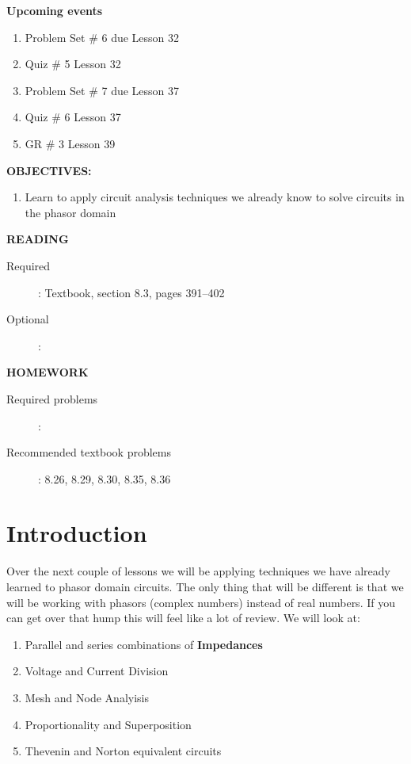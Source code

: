 \documentclass{handout}
\begin{document}
\maketitle

\textbf{Upcoming events}
\begin{enumerate}
\item Problem Set \# 6 due Lesson 32
\item Quiz \# 5 Lesson 32
\item Problem Set \# 7 due Lesson 37
\item Quiz \# 6 Lesson 37
\item GR \# 3 Lesson 39
\end{enumerate}

\textbf{OBJECTIVES:}
\begin{enumerate}
\item Learn to apply circuit analysis techniques we already know to solve circuits in the phasor domain
\end{enumerate}

\textbf{READING}
\begin{description}
\item [Required]:
Textbook, section 8.3, pages 391--402
\item [Optional]: 
\end{description}

\textbf{HOMEWORK}
\begin{description}
\item [Required problems]: 
\item [Recommended textbook problems]: 8.26, 8.29, 8.30, 8.35, 8.36
\end{description}

\section{Introduction}
Over the next couple of lessons we will be applying techniques we have already learned to phasor domain circuits.  The only thing that will be different is that we will be working with phasors (complex numbers) instead of real numbers.  If you can get over that hump this will feel like a lot of review.  We will look at:
\begin{enumerate}
\item Parallel and series combinations of \textbf{Impedances}
\item Voltage and Current Division
\item Mesh and Node Analyisis
\item Proportionality and Superposition
\item Thevenin and Norton equivalent circuits
\end{enumerate}
\end{document}
